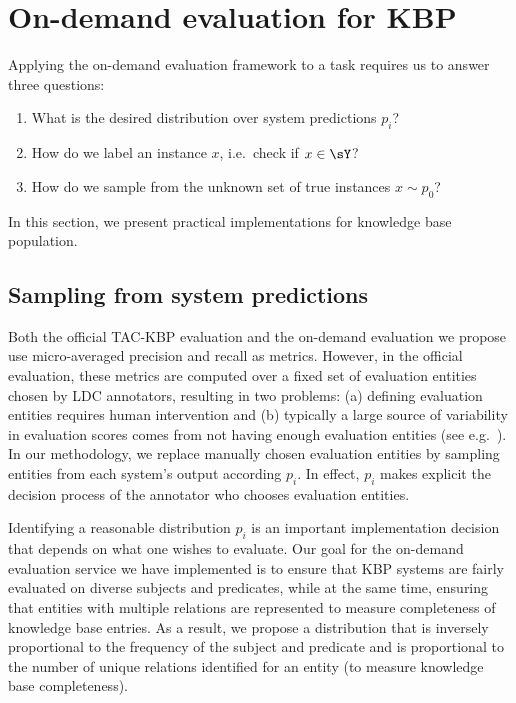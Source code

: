 \section{On-demand evaluation for KBP}
\label{sec:application}
Applying the on-demand evaluation framework to a task requires us to answer three questions:
\begin{enumerate}
    \itemsep0pt
  \item What is the desired distribution over system predictions $p_i$?
  \item How do we label an instance $x$, i.e.\ check if $x \in \sY$?
  \item How do we sample from the unknown set of true instances $x \sim p_0$?
\end{enumerate}
In this section, we present practical implementations for knowledge base population.

\subsection{Sampling from system predictions}
Both the official TAC-KBP evaluation and the on-demand evaluation we propose use micro-averaged precision and recall as metrics. However, in the official evaluation, these metrics are computed over a fixed set of evaluation entities chosen by LDC annotators, resulting in two problems: (a) defining evaluation entities requires human intervention and (b) typically a large source of variability in evaluation scores comes from not having enough evaluation entities (see e.g.\ \citep{webber2010measurement}). In our methodology, we replace manually chosen evaluation entities by sampling entities from each system’s output according $p_i$. In effect, $p_i$ makes explicit the decision process of the annotator who chooses evaluation entities.

Identifying a reasonable distribution $p_i$ is an important implementation decision that depends on what one wishes to evaluate.
Our goal for the on-demand evaluation service we have implemented is to ensure that KBP systems are fairly evaluated on diverse subjects and predicates, while at the same time, ensuring that entities with multiple relations are represented to measure completeness of knowledge base entries.
As a result, we propose a distribution that is inversely proportional to the frequency of the subject and predicate and is proportional to the number of unique relations identified for an entity (to measure knowledge base completeness).

